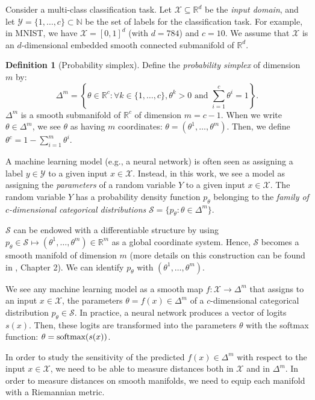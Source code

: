 \documentclass[entropy,article,submit,pdftex,moreauthors]{Definitions/mdpi}
\newcommand{\R}{\ensuremath{\mathbb{R}}}
\newcommand{\N}{\ensuremath{\mathbb{N}}}
\theoremstyle{plain}
\theoremstyle{definition}
\newtheorem{definition}[theorem]{Definition}
\newcommand{\Sc}{\mathcal{S}}
\newcommand{\X}{\mathcal{X}}
\newcommand{\Y}{\mathcal{Y}}
\begin{document}
Consider a multi-class classification task. Let $\X \subseteq \R^d$ be the \emph{input domain}, and let $\Y  = \{1, \dots, c\} \subset \N$ be the set of labels for the classification task. For example, in MNIST, we have $\X = [0,1]^d$ (with $d=784$) and $c=10$. We assume that $\X$ is an $d$-dimensional embedded smooth connected submanifold of $\R^d$.
\begin{definition}[Probability simplex]
    \label{def:simplex}
    Define the \emph{probability simplex} of dimension $m$ by:
    \small
    \begin{equation*}
        \Delta^m = \left\{\theta \in \R^c : \forall k \in \{1, \dots, c\}, \theta^k > 0 \text{ and } \sum_{i=1}^c \theta^i = 1 \right\}.
    \end{equation*}
    \normalsize
    $\Delta^m$ is a smooth submanifold of $\R^c$ of dimension $m=c-1$. When we write $\theta \in \Delta^m$, we see $\theta$ as having $m$ coordinates: $\theta = (\theta^1, \dots, \theta^m)$. Then, we define $\theta^c = 1 - \sum_{i=1}^m \theta^i$.
\end{definition}
A machine learning model (e.g., a neural network) is often seen as assigning a label $y \in \Y$ to a given input $x \in \X$. Instead, in this work, we see a model as assigning the \emph{parameters} of a random variable $Y$ to a given input $x \in \X$. The random variable $Y$ has a probability density function $p_\theta$ belonging to the \emph{family of $c$-dimensional categorical distributions} $\Sc = \{p_\theta : \theta \in \Delta^m\}$.

$\Sc$ can be endowed with a differentiable structure by using $p_\theta \in \Sc \mapsto (\theta^1, \dots, \theta^m) \in \R^m$ as a global coordinate system. Hence, $\Sc$ becomes a smooth manifold of dimension $m$ (more details on this construction can be found in \citep{amariDifferentialGeometricalMethodsStatistics1985}, Chapter 2). We can identify $p_\theta$ with $(\theta^1, \dots, \theta^m)$.

We see any machine learning model as a smooth map $f: \X \rightarrow \Delta^m$ that assigns to an input $x \in \X$, the parameters $\theta=f(x) \in \Delta^m$ of a $c$-dimensional categorical distribution $p_\theta \in \Sc$. In practice, a neural network produces a vector of logits $s(x)$. Then, these logits are transformed into the parameters $\theta$ with the softmax function: $\theta = \textnormal{softmax}(s(x))$.

In order to study the sensitivity of the predicted $f(x) \in \Delta^m$ with respect to the input $x \in \X$, we need to be able to measure distances both in $\X$ and in $\Delta^m$. In order to measure distances on smooth manifolds, we need to equip each manifold with a Riemannian metric.
\end{document}
